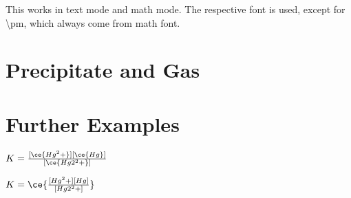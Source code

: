\documentclass[a4paper,notitlepage,parskip=half]{scrreprt}
\newcommand\macro[1]{\mbox{\ttfamily\textbackslash#1}}
\begin{document}
\begin{SideBySideExample}[xrightmargin=3cm]
\end{SideBySideExample}

\begin{SideBySideExample}[xrightmargin=3cm]
\end{SideBySideExample}

\begin{SideBySideExample}[xrightmargin=3cm]
\end{SideBySideExample}

\begin{SideBySideExample}[xrightmargin=3cm]
\end{SideBySideExample}

This works in text mode and math mode. The respective font is used, except for \macro{pm}, which always come from math font.


\section{Precipitate and Gas}

\begin{SideBySideExample}[xrightmargin=6cm]
\end{SideBySideExample}

\begin{SideBySideExample}[xrightmargin=6cm]
\end{SideBySideExample}


\section{Further Examples}

\begin{Example}[xrightmargin=15cm]
\end{Example}

\begin{Example}[xrightmargin=5cm]
  $K = \frac{[\ce{Hg^2+}][\ce{Hg}]}{[\ce{Hg2^2+}]}$
\end{Example}

\begin{Example}[xrightmargin=5cm]
  $K = \ce{\frac{[Hg^2+][Hg]}{[Hg2^2+]}}$
\end{Example}
\end{document}
